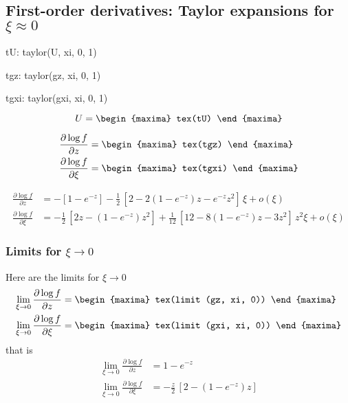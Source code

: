 \subsection{First-order derivatives: Taylor expansions for $\xi \approx 0$}
\begin{maxima}
  tU: taylor(U, xi, 0, 1)
\end{maxima}
\begin{maxima}
  tgz: taylor(gz, xi, 0, 1)
\end{maxima}
\begin{maxima}
  tgxi: taylor(gxi, xi, 0, 1)
\end{maxima}
{\color{MonVertF}
$$
U =
\begin{maxima}
  tex(tU)
\end{maxima}
$$
}

{\color{MonVertF}
\begin{align*}
  \frac{\partial \log f}{\partial z} &= 
  \begin{maxima}
    tex(tgz)
  \end{maxima} \\
  \frac{\partial \log f}{\partial \xi} &= 
  \begin{maxima}
    tex(tgxi)
  \end{maxima}
\end{align*}
}

{\color{red}
\begin{align*}
\frac{\partial \log f}{\partial z} &= -\left[ 1 - e^{-z} \right]
- \frac{1}{2}\, \left[2 -2 (1 - e^{-z}) z -  e^{-z} z^2 \right] \, \xi + o(\xi)  \\
\frac{\partial \log f}{\partial \xi} &= -\frac{1}{2}\,\left[ 2 z - (1 - e^{-z}) z^2 \right]
+  \frac{1}{12}\, \left[12 - 8 (1 - e^{-z}) z - 3z^2\right] \, z^2 \xi + o(\xi) 
\end{align*}
}

\subsubsection*{Limits for $\xi \to 0$}
Here are the limits for $\xi \to 0$
{\color{MonVertF}
  \begin{align*}
  \lim_{\xi \to 0} \frac{\partial \log f}{\partial z}
  &=
    \begin{maxima}
      tex(limit (gz, xi, 0))
    \end{maxima}
  \\
  \lim_{\xi \to 0} \frac{\partial \log f}{\partial \xi}
  &=
    \begin{maxima}
      tex(limit (gxi, xi, 0))
    \end{maxima}
\end{align*}}
that is
{\color{red}
  \begin{align*}
  \lim_{\xi \to 0} \frac{\partial \log f}{\partial z}
  &= 1 - e^{-z}
  \\
  \lim_{\xi \to 0} \frac{\partial \log f}{\partial \xi}
  &= -\frac{z}{2} \,\left[2 - (1 - e^{-z}) z \right] 
\end{align*}}



